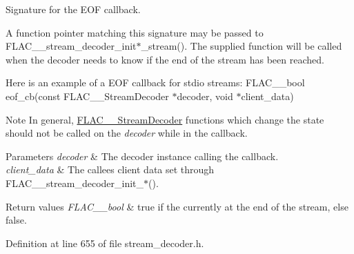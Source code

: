 Signature for the E\+OF callback.

A function pointer matching this signature may be passed to F\+L\+A\+C\+\_\+\+\_\+stream\+\_\+decoder\+\_\+init$\ast$\+\_\+stream(). The supplied function will be called when the decoder needs to know if the end of the stream has been reached.

Here is an example of a E\+OF callback for stdio streams\+: F\+L\+A\+C\+\_\+\+\_\+bool eof\+\_\+cb(const F\+L\+A\+C\+\_\+\+\_\+\+Stream\+Decoder $\ast$decoder, void $\ast$client\+\_\+data) 
\begin{DoxyCode}{0}
\DoxyCodeLine{\{}
\DoxyCodeLine{\}}
\end{DoxyCode}


\begin{DoxyNote}{Note}
In general, \mbox{\hyperlink{struct_f_l_a_c_____stream_decoder}{F\+L\+A\+C\+\_\+\+\_\+\+Stream\+Decoder}} functions which change the state should not be called on the {\itshape decoder} while in the callback.
\end{DoxyNote}

\begin{DoxyParams}{Parameters}
{\em decoder} & The decoder instance calling the callback. \\
\hline
{\em client\+\_\+data} & The callee\textquotesingle{}s client data set through F\+L\+A\+C\+\_\+\+\_\+stream\+\_\+decoder\+\_\+init\+\_\+$\ast$(). \\
\hline
\end{DoxyParams}

\begin{DoxyRetVals}{Return values}
{\em F\+L\+A\+C\+\_\+\+\_\+bool} & {\ttfamily true} if the currently at the end of the stream, else {\ttfamily false}. \\
\hline
\end{DoxyRetVals}


Definition at line 655 of file stream\+\_\+decoder.\+h.

\mbox{\label{group__flac__stream__decoder_gac896ee6a12668e9015fab4fbc6aae996}} 
